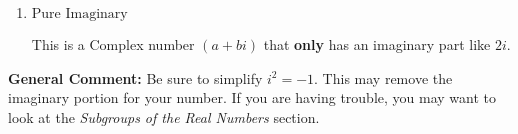 \documentclass{extbook}[14pt]
\begin{document}
\begin{enumerate}
{\begin{enumerate}[label=\Alph*.]
This is a Complex number $(a+bi)$ that is not Real (has $i$ as part of the number).
\item \( \text{Pure Imaginary} \)

This is a Complex number $(a+bi)$ that \textbf{only} has an imaginary part like $2i$.
\end{enumerate}

\textbf{General Comment:} Be sure to simplify $i^2 = -1$. This may remove the imaginary portion for your number. If you are having trouble, you may want to look at the \textit{Subgroups of the Real Numbers} section.
}
\end{enumerate}
\end{document}
